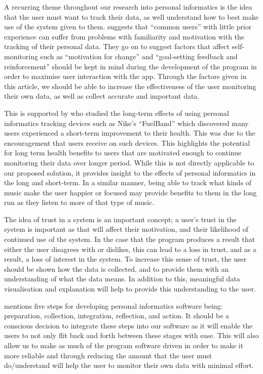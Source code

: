 \documentclass[10pt]{report}
\begin{document}
A recurring theme throughout our research into personal informatics is the idea that the user must want to track their data, as well understand how to best make use of the system given to them. \cite{Rapp2014a} suggests that “common users” with little prior experience can suffer from problems with familiarity and motivation with the tracking of their personal data. They go on to suggest factors that affect self-monitoring such as “motivation for change” and “goal-setting feedback and reinforcement” should be kept in mind during the development of the program in order to maximise user interaction with the app. Through the factors given in this article, we should be able to increase the effectiveness of the user monitoring their own data, as well as collect accurate and important data.

This is supported by \cite{Fritz2014} who studied the long-term effects of using personal informatics tracking devices such as Nike’s “FuelBand” which discovered many users experienced a short-term improvement to their health. This was due to the encouragement that users receive on such devices. This highlights the potential for long term health benefits to users that are motivated enough to continue monitoring their data over longer period. While this is not directly applicable to our proposed solution, it provides insight to the effects of personal informatics in the long and short-term. In a similar manner, being able to track what kinds of music make the user happier or focused may provide benefits to them in the long run as they listen to more of that type of music.

The idea of trust in a system is an important concept; a user’s trust in the system is important as that will affect their motivation, and their likelihood of continued use of the system. In the case that the program produces a result that either the user disagrees with or dislikes, this can lead to a loss in trust, and as a result, a loss of interest in the system. To increase this sense of trust, the user should be shown how the data is collected, and to provide them with an understanding of what the data means. In addition to this, meaningful data visualisation and explanation will help to provide this understanding to the user. \cite{Jaimes2013}

\cite{Li2010} mentions five steps for developing personal informatics software being: preparation, collection, integration, reflection, and action.  It should be a conscious decision to integrate these steps into our software as it will enable the users to not only flit back and forth between these stages with ease. This will also allow us to make as much of the program software driven in order to make it more reliable and through reducing the amount that the user must do/understand will help the user to monitor their own data with minimal effort.
\end{document}
